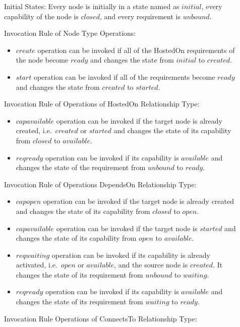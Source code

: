 \documentclass[12pt]{report}
\begin{document}
\begin{description}
\item[]Initial States: Every node is initially in a state named as
  $initial$, every capability of the node is $closed$, and
  every requirement is $unbound$.
\item[] Invocation Rule of Node Type Operations:
  \begin{itemize}
  \item $create$ operation can be invoked if all of the HostedOn
    requirements of the node become $ready$ and changes the state from
    $initial$ to $created$.
  \item $start$ operation can be invoked if all of the requirements
    become $ready$ and changes the state from $created$ to $started$.
  \end{itemize}
\item[] Invocation Rule of Operations of HostedOn Relationship Type:
  \begin{itemize}
  \item $capavailable$ operation can be invoked if the target node is
    already created, i.e.\ $created$ or $started$ and changes the state
    of its capability from $closed$ to $available$.
  \item $reqready$ operation can be invoked if its capability is
    $available$ and changes the state of the requirement from $unbound$
    to $ready$.
  \end{itemize}
\item[] Invocation Rule of Operations DependsOn Relationship Type:
  \begin{itemize}
  \item $capopen$ operation can be invoked if the target node is
    already created and changes the state of its capability from
    $closed$ to $open$.
  \item $capavailable$ operation can be invoked if the target node is
    $started$ and changes the state of its capability from
    $open$ to $available$.
  \item $reqwaiting$ operation can be invoked if its capability is already
    activated, i.e.\ $open$ or $available$, and the source node is
    $created$. It changes the state of its requirement from
    $unbound$ to $waiting$.
  \item $reqready$ operation can be invoked if its capability is
    $available$ and changes the state of its requirement from
    $waiting$ to $ready$.
  \end{itemize}
\item[] Invocation Rule Operations of ConnectsTo Relationship Type:

\end{description}
\end{document}
